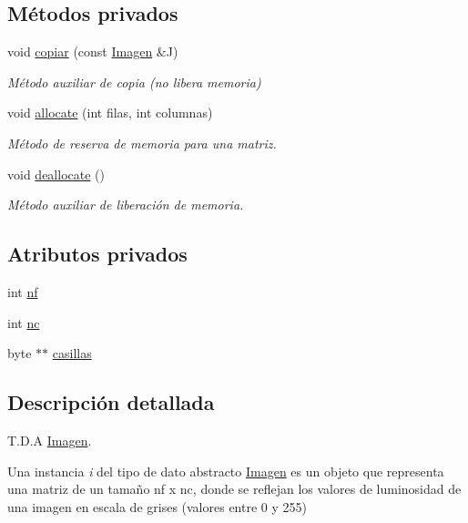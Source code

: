 \subsection*{Métodos privados}
\begin{DoxyCompactItemize}
\item 
void \hyperlink{classImagen_a413866cbb4ddb48f512877e75a73eba3}{copiar} (const \hyperlink{classImagen}{Imagen} \&J)
\begin{DoxyCompactList}\small\item\em Método auxiliar de copia (no libera memoria) \end{DoxyCompactList}\item 
void \hyperlink{classImagen_affa85e2b6da3fb00c71b96653693d09b}{allocate} (int filas, int columnas)
\begin{DoxyCompactList}\small\item\em Método de reserva de memoria para una matriz. \end{DoxyCompactList}\item 
\mbox{\label{classImagen_a50bdabe1d37bc418b2076e70a5a8402c}} 
void \hyperlink{classImagen_a50bdabe1d37bc418b2076e70a5a8402c}{deallocate} ()
\begin{DoxyCompactList}\small\item\em Método auxiliar de liberación de memoria. \end{DoxyCompactList}\end{DoxyCompactItemize}
\subsection*{Atributos privados}
\begin{DoxyCompactItemize}
\item 
int \hyperlink{classImagen_ae057b7b7de2b7d6371f9c89fdc3358fe}{nf}
\item 
int \hyperlink{classImagen_a0921ad9dff3caf6bb4d86eb7c1aeba60}{nc}
\item 
byte $\ast$$\ast$ \hyperlink{classImagen_a151b692f46d9acc42be59fc0fdc50529}{casillas}
\end{DoxyCompactItemize}


\subsection{Descripción detallada}
T.\+D.\+A \hyperlink{classImagen}{Imagen}. 

Una instancia {\itshape i} del tipo de dato abstracto {\ttfamily \hyperlink{classImagen}{Imagen}} es un objeto que representa una matriz de un tamaño nf x nc, donde se reflejan los valores de luminosidad de una imagen en escala de grises (valores entre 0 y 255)

